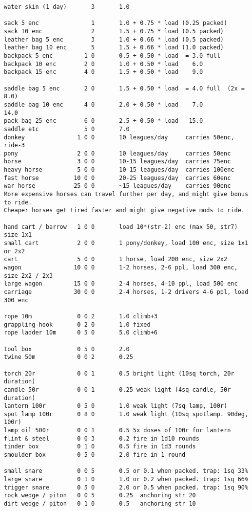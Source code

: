 \begin{verbatim}
water skin (1 day)       3       1.0

sack 5 enc               1       1.0 + 0.75 * load (0.25 packed)
sack 10 enc              2       1.5 + 0.75 * load (0.5 packed)
leather bag 5 enc        3       1.0 + 0.66 * load (0.5 packed)
leather bag 10 enc       5       1.5 + 0.66 * load (1.0 packed)
backpack 5 enc         1 0       0.5 + 0.50 * load  = 3.0 full
backpack 10 enc        2 0       1.0 + 0.50 * load    6.0
backpack 15 enc        4 0       1.5 + 0.50 * load    9.0

saddle bag 5 enc       2 0       1.5 + 0.50 * load  = 4.0 full  (2x = 8.0)
saddle bag 10 enc      4 0       2.0 + 0.50 * load    7.0            14.0
pack bag 25 enc        6 0       2.5 + 0.50 * load   15.0
saddle etc             5 0       7.0
donkey               1 0 0       10 leagues/day     carries 50enc, ride-3
pony                 2 0 0       10 leagues/day     carries 50enc
horse                3 0 0       10-15 leagues/day  carries 75enc
heavy horse          5 0 0       10-15 leagues/day  carries 100enc
fast horse          10 0 0       20-25 leagues/day  carries 60enc
war horse           25 0 0       ~15 leagues/day    carries 90enc
More expensive horses can travel further per day, and might give bonus to ride.
Cheaper horses get tired faster and might give negative mods to ride.

hand cart / barrow   1 0 0       load 10*(str-2) enc (max 50, str7) size 1x1
small cart           2 0 0       1 pony/donkey, load 100 enc, size 1x1 or 2x2
cart                 5 0 0       1 horse, load 200 enc, size 2x2
wagon               10 0 0       1-2 horses, 2-6 ppl, load 300 enc, size 2x2 / 2x3
large wagon         15 0 0       2-4 horses, 4-10 ppl, load 500 enc
carriage            30 0 0       2-4 horses, 1-2 drivers 4-6 ppl, load 300 enc

rope 10m             0 0 2       1.0 climb+3
grappling hook       0 2 0       1.0 fixed
rope ladder 10m      0 5 0       5.0 climb+6

tool box             0 5 0       2.0
twine 50m            0 0 2       0.25

torch 20r            0 0 1       0.5 bright light (10sq torch, 20r duration)
candle 50r           0 0 1       0.25 weak light (4sq candle, 50r duration)
lantern 100r         0 5 0       1.0 weak light (7sq lamp, 100r)
spot lamp 100r       0 8 0       1.0 weak light (10sq spotlamp. 90deg, 100r)
lamp oil 500r        0 0 1       0.5 5x doses of 100r for lantern
flint & steel        0 0 3       0.2 fire in 1d10 rounds
tinder box           0 1 0       0.5 fire in 1d3 rounds
smoulder box         0 5 0       2.0 fire in 1 round

small snare          0 0 5       0.5 or 0.1 when packed. trap: 1sq 33%
large snare          0 1 0       1.0 or 0.2 when packed. trap: 1sq 66%
trigger snare        0 5 0       2.0 or 0.5 when packed. trap: 1sq 90%
rock wedge / piton   0 0 5       0.25  anchoring str 20
dirt wedge / piton   0 1 0       0.5   anchoring str 10
\end{verbatim}
\normalsize






